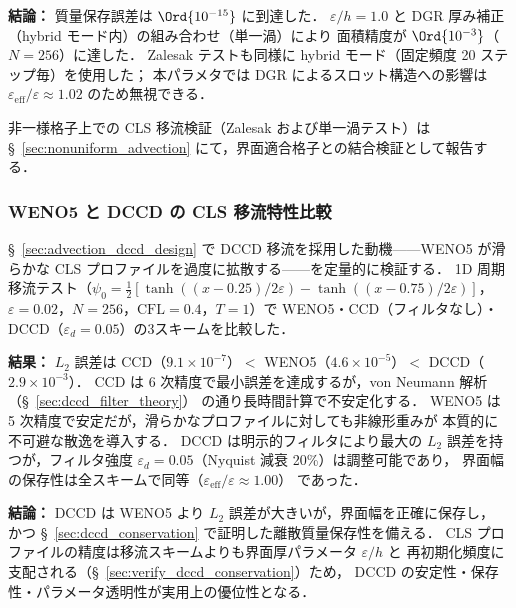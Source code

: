 \noindent\textbf{結論：}
質量保存誤差は $\Ord{10^{-15}}$ に到達した．
$\varepsilon/h = 1.0$ と DGR 厚み補正（hybrid モード内）の組み合わせ（単一渦）により
面積精度が $\Ord{10^{-3}}$（$N = 256$）に達した．
Zalesak テストも同様に hybrid モード（固定頻度 20 ステップ毎）を使用した；
本パラメタでは DGR によるスロット構造への影響は
$\varepsilon_{\mathrm{eff}}/\varepsilon \approx 1.02$ のため無視できる．

非一様格子上での CLS 移流検証（Zalesak および単一渦テスト）は
§~\ref{sec:nonuniform_advection} にて，界面適合格子との結合検証として報告する．


\subsubsection{WENO5 と DCCD の CLS 移流特性比較}
\label{sec:verify_weno5_vs_dccd}

§~\ref{sec:advection_dccd_design} で DCCD 移流を採用した動機——WENO5 が滑らかな CLS
プロファイルを過度に拡散する——を定量的に検証する．
1D 周期移流テスト（$\psi_0 = \tfrac{1}{2}[\tanh((x{-}0.25)/2\varepsilon) - \tanh((x{-}0.75)/2\varepsilon)]$，
$\varepsilon = 0.02$，$N = 256$，$\mathrm{CFL} = 0.4$，$T = 1$）で
WENO5・CCD（フィルタなし）・DCCD（$\varepsilon_d = 0.05$）の3スキームを比較した．

\noindent\textbf{結果：}
$L_2$ 誤差は CCD（$9.1 \times 10^{-7}$）$<$ WENO5（$4.6 \times 10^{-5}$）$<$
DCCD（$2.9 \times 10^{-3}$）．
CCD は 6 次精度で最小誤差を達成するが，von Neumann 解析（§~\ref{sec:dccd_filter_theory}）
の通り長時間計算で不安定化する．
WENO5 は 5 次精度で安定だが，滑らかなプロファイルに対しても非線形重みが
本質的に不可避な散逸を導入する．
DCCD は明示的フィルタにより最大の $L_2$ 誤差を持つが，フィルタ強度
$\varepsilon_d = 0.05$（Nyquist 減衰 20\%）は調整可能であり，
界面幅の保存性は全スキームで同等（$\varepsilon_{\mathrm{eff}}/\varepsilon \approx 1.00$）
であった．

\noindent\textbf{結論：}
DCCD は WENO5 より $L_2$ 誤差が大きいが，界面幅を正確に保存し，
かつ §~\ref{sec:dccd_conservation} で証明した離散質量保存性を備える．
CLS プロファイルの精度は移流スキームよりも界面厚パラメータ $\varepsilon/h$ と
再初期化頻度に支配される（§~\ref{sec:verify_dccd_conservation}）ため，
DCCD の安定性・保存性・パラメータ透明性が実用上の優位性となる．

